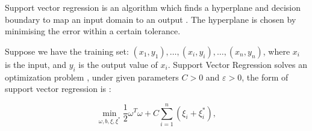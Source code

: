 %
%
%
%
%
%











Support vector regression is an algorithm which finds a hyperplane and decision boundary to map an input domain to an output \cite{Cortes1995}. The hyperplane is chosen by minimising the error within a certain tolerance.

Suppose we have the training set: $(x_1,y_1), \ldots,(x_i,y_i),\ldots,(x_n,y_n)$, where $x_i$ is the input, and $y_i$ is the output value of $x_i$. Support Vector Regression solves an optimization problem \cite{Chen2004, Shu2006}, under given parameters $C>0$ and $\varepsilon >0$, the form of support vector regression is \cite{Drucker1997}: 

\begin{equation}
\min_{\omega,b,\xi,\xi^{*}}\frac{1}{2}\omega^T\omega+C\sum_{i=1}^{n}(\xi_i+\xi_i^*),
\end{equation}

